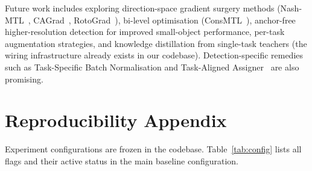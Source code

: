 \documentclass[conference]{IEEEtran}
\begin{document}
Future work includes exploring direction-space gradient surgery methods (Nash-MTL~\cite{navon2022nashmtl}, CAGrad~\cite{liu2021cagrad}, RotoGrad~\cite{javaloy2022rotograd}), bi-level optimisation (ConsMTL~\cite{raychaudhuri2022consmtl}), anchor-free higher-resolution detection for improved small-object performance, per-task augmentation strategies, and knowledge distillation from single-task teachers (the wiring infrastructure already exists in our codebase). Detection-specific remedies such as Task-Specific Batch Normalisation and Task-Aligned Assigner~\cite{feng2021tood} are also promising.

\appendix
\section{Reproducibility Appendix}
\label{app:reproducibility}

Experiment configurations are frozen in the codebase. Table~\ref{tab:config} lists all flags and their active status in the main baseline configuration.
\end{document}
